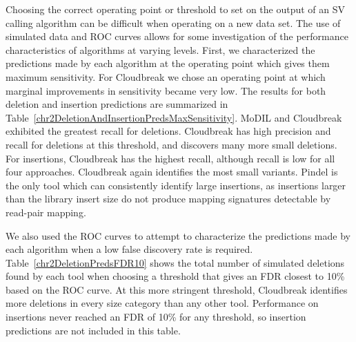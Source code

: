 Choosing the correct operating point or threshold to set on the output of an SV calling algorithm can be difficult when operating on a new data set. The use of simulated data and ROC curves allows for some investigation of the performance characteristics of algorithms at varying levels. First, we characterized the predictions made by each algorithm at the operating point which gives them maximum sensitivity. For Cloudbreak we chose an operating point at which marginal improvements in sensitivity became very low. The results for both deletion and insertion predictions are summarized in Table~\ref{chr2DeletionAndInsertionPredsMaxSensitivity}. MoDIL and Cloudbreak exhibited the greatest recall for deletions. Cloudbreak has high precision and recall for deletions at this threshold, and discovers many more small deletions. For insertions, Cloudbreak has the highest recall, although recall is low for all four approaches. Cloudbreak again identifies the most small variants. Pindel is the only tool which can consistently identify large insertions, as insertions larger than the library insert size do not produce mapping signatures detectable by read-pair mapping. 

We also used the ROC curves to attempt to characterize the predictions made by each algorithm when a low false discovery rate is required. Table~\ref{chr2DeletionPredsFDR10} shows the total number of simulated deletions found by each tool when choosing a threshold that gives an FDR closest to 10\% based on the ROC curve. At this more stringent threshold, Cloudbreak identifies more deletions in every size category than any other tool. Performance on insertions never reached an FDR of 10\% for any threshold, so insertion predictions are not included in this table. 

